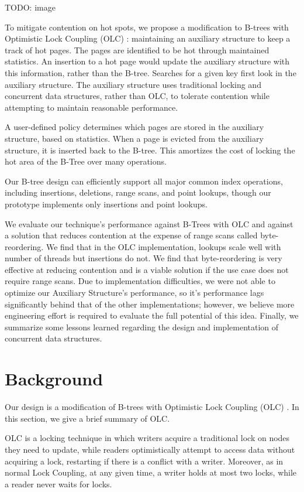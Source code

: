 \documentclass[twocolumn]{article}
\begin{document}
TODO: image

To mitigate contention on hot spots, we propose a modification to B-trees with
Optimistic Lock Coupling (OLC) \cite{art}: maintaining an auxiliary structure to keep
a track of hot pages. The pages are identified to be hot through maintained
statistics. An insertion to a hot page would update the auxiliary structure
with this information, rather than the B-tree. Searches for a given key first
look in the auxiliary structure. The auxiliary structure uses traditional
locking and concurrent data structures, rather than OLC, to tolerate contention
while attempting to maintain reasonable performance.

A user-defined policy determines which pages are stored in the auxiliary
structure, based on statistics. When a page is evicted from the auxiliary
structure, it is inserted back to the B-tree. This amortizes the cost of
locking the hot area of the B-Tree over many operations.

Our B-tree design can efficiently support all major common index operations,
including insertions, deletions, range scans, and point lookups, though our
prototype implements only insertions and point lookups.

We evaluate our technique’s performance against B-Trees with OLC and against a
solution that reduces contention at the expense of range scans called
byte-reordering. We find that in the OLC implementation, lookups scale well
with number of threads but insertions do not. We find that byte-reordering is
very effective at reducing contention and is a viable solution if the use case
does not require range scans. Due to implementation difficulties, we were not
able to optimize our Auxiliary Structure’s performance, so it’s performance
lags significantly behind that of the other implementations; however, we
believe more engineering effort is required to evaluate the full potential of
this idea. Finally, we summarize some lessons learned regarding the design and
implementation of concurrent data structures.

\section{Background}

Our design is a modification of B-trees with Optimistic Lock Coupling (OLC)
\cite{art}. In this section, we give a brief summary of OLC.

OLC is a locking technique in which writers acquire a traditional lock on nodes
they need to update, while readers optimistically attempt to access data
without acquiring a lock, restarting if there is a conflict with a writer.
Moreover, as in normal Lock Coupling, at any given time, a writer holds at most
two locks, while a reader never waits for locks.
\end{document}
